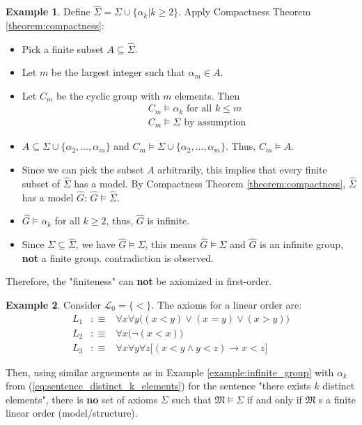 \documentclass[11pt,letterpaper]{book}
\theoremstyle{definition}
\newtheorem{example}{Example}[section]
\begin{document}
\begin{example}
Define $\hat{\Sigma} = \Sigma \cup \{ \alpha_k \big| k \geq 2  \} $.
Apply Compactness Theorem \ref{theorem:compactness}:
\begin{itemize}
\item{Pick a finite subset $A \subseteq \hat{\Sigma} $.}
\item{Let $m$ be the largest integer such that $\alpha_m \in A$.}
\item{Let $C_m$ be the cyclic group with $m$ elements. Then
       \begin{eqnarray*}
         & & C_m \models \alpha_k \text{ for all $k \leq m$} \\
         & & C_m \models \Sigma \text{ by assumption}
       \end{eqnarray*}
}
\item{$A \subseteq \Sigma \cup \{\alpha_2, \ldots, \alpha_m \}$ and $C_m
\models \Sigma \cup \{\alpha_2, \ldots, \alpha_m  \} $. Thus, $C_m
\models A$.}
\item{Since we can pick the subset $A$ arbitrarily, this implies that
every finite subset of $\hat{\Sigma}$ has a model. By Compactness
Theorem \ref{theorem:compactness}, $\hat{\Sigma}$ has a model $\hat{G}$:
$\hat{G} \models \hat{\Sigma}$. }
\item{$\hat{G} \models \alpha_k $ for all $k \geq 2$, thus, $\hat{G}$ is
infinite.}
\item{Since $\Sigma \subseteq \hat{\Sigma}$, we have $\hat{G} \models
\Sigma$, this means $\hat{G} \models \Sigma$ and $\hat{G}$ is an
infinite group, \textbf{not} a finite group. contradiction is observed.}
\end{itemize}

Therefore, the "finiteness" can \textbf{not} be axiomized in first-order.
\end{example}

\begin{example}
     Consider $\mathcal{L}_0 = \{ < \}$. The axioms for a linear order are:
     \begin{eqnarray*}
       L_1 & : \equiv & \forall x \forall y \big( ( x < y ) \lor ( x = y )
\lor ( x > y )  \big) \\
       L_2 & : \equiv & \forall x \big( \lnot (x < x) \big) \\
       L_3 & : \equiv & \forall x \forall y \forall z \big[ (x < y \land y
< z ) \rightarrow x < z  \big]
     \end{eqnarray*}

Then, using similar arguements as in Example
\ref{example:infinite_group} with $\alpha
_k$ from (\ref{eq:sentence_distinct_k_elements}) for the sentence "there
exists $k$ distinct elements",  there is \textbf{no} set of axioms
$\Sigma$ such that $\mathfrak{M} \models \Sigma $ if and only if
$\mathfrak{M}$ s a finite linear order (model/structure).

\end{example}
\end{document}
